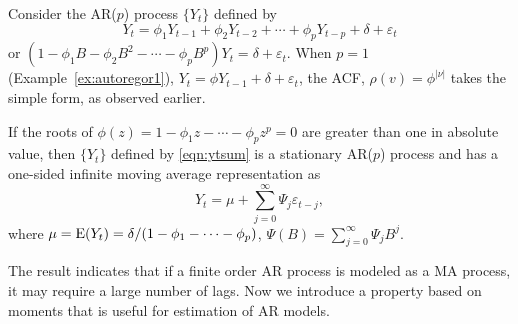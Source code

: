 Consider the AR($p$) process $\{ Y_t \}$ defined by
	\begin{equation} \label{eqn:ytsum}
	Y_t = \phi_1 Y_{t-1} + \phi_2 Y_{t-2} + \cdots + \phi_p Y_{t-p} + \delta + \varepsilon_t
	\end{equation}
or $(1 - \phi_1 B - \phi_2 B^2 - \cdots - \phi_p B^p) Y_t = \delta + \varepsilon_t$. When $p= 1$ (Example~\ref{ex:autoregor1}), $Y_t = \phi Y_{t-1} + \delta + \varepsilon_t$, the ACF, $\rho(v)= \phi^{\lvert \nu \rvert}$ takes the simple form, as observed earlier.


\begin{result}
If the roots of $\phi(z) = 1- \phi_1 z - \cdots - \phi_p z^p = 0$ are greater than one in absolute value, then $\{ Y_t \}$ defined by \eqref{eqn:ytsum} is a stationary AR($p$) process and has a one-sided infinite moving average representation as
	\begin{equation} \label{eqn:ytthm}
	Y_t= \mu + \sum_{j=0}^\infty \Psi_j\varepsilon_{t-j},
	\end{equation}
where $\mu = \operatorname{E}(Y_t) = \delta / (1 - \phi_1 - \cdots - \phi_p)$, $\Psi(B) = \sum_{j=0}^\infty \Psi_j B^j$. 
\end{result}


The result indicates that if a finite order AR process is modeled as a MA process, it may require a large number of lags. Now we introduce a property based on moments that is useful for estimation of AR models.


